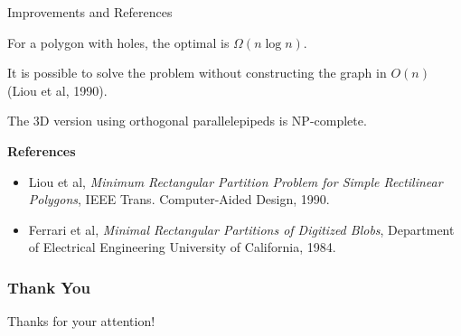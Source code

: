 \documentclass{beamer}
\begin{document}
\begin{frame}{Improvements and References}

For a polygon with holes, the optimal is $\Omega(n \log n)$.

It is possible to solve the problem without constructing the graph in
$O(n)$ (Liou et al, 1990).

The 3D version using orthogonal parallelepipeds is NP-complete.


\textbf{References}

  \begin{itemize}
    \item Liou et al, \emph{Minimum Rectangular Partition Problem for Simple
Rectilinear Polygons}, IEEE Trans. Computer-Aided Design, 1990.
    \item Ferrari et al, \emph{Minimal Rectangular Partitions of Digitized Blobs}, Department of Electrical Engineering University of California, 1984.
  \end{itemize}
\end{frame}


\begin{frame}
    \frametitle{Thank You}
    \centering
    \Huge Thanks for your attention!
\end{frame}
\end{document}
